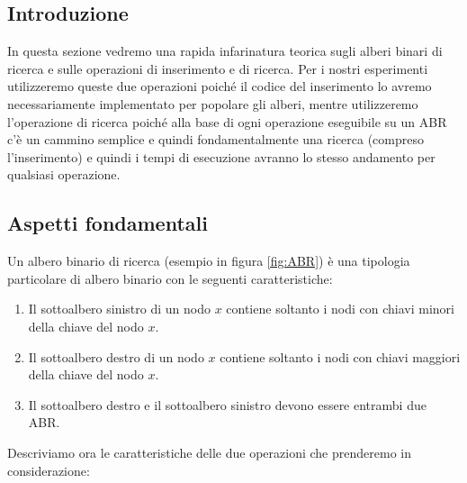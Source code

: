 \subsection{Introduzione}
\label{sec:Introduzione_1}
In questa sezione vedremo una rapida infarinatura teorica sugli alberi binari di ricerca e sulle operazioni di inserimento e di ricerca. Per i nostri esperimenti
utilizzeremo queste due operazioni poiché il codice del inserimento lo avremo necessariamente implementato per popolare gli alberi, mentre utilizzeremo l'operazione
di ricerca poiché alla base di ogni operazione eseguibile su un ABR c'è un cammino semplice e quindi fondamentalmente una ricerca (compreso l'inserimento) e quindi i tempi di esecuzione avranno lo stesso andamento per qualsiasi operazione. 


\subsection{Aspetti fondamentali}
\label{sec:AspettiFondamentali_1}

Un albero binario di ricerca (esempio in figura \ref{fig:ABR}) è una tipologia particolare di albero binario con le seguenti caratteristiche:
\begin{enumerate}
    \item Il sottoalbero sinistro di un nodo $x$ contiene soltanto i nodi con chiavi minori della chiave del nodo $x$.
    \item Il sottoalbero destro di un nodo $x$ contiene soltanto i nodi con chiavi maggiori della chiave del nodo $x$.
    \item Il sottoalbero destro e il sottoalbero sinistro devono essere entrambi due ABR.
\end{enumerate}
Descriviamo ora le caratteristiche delle due operazioni che prenderemo in considerazione:

